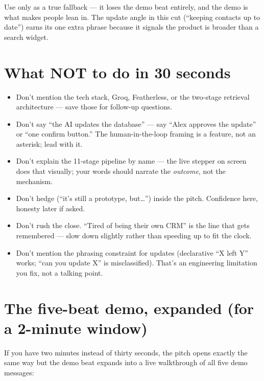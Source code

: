 \documentclass[11pt]{article}
\begin{document}
Use only as a true fallback --- it loses the demo beat entirely, and the demo is what makes people lean in. The update angle in this cut (``keeping contacts up to date'') earns its one extra phrase because it signals the product is broader than a search widget.

\section{What NOT to do in 30 seconds}
\begin{itemize}
    \item Don't mention the tech stack, Groq, Featherless, or the two-stage retrieval architecture --- save those for follow-up questions.
    \item Don't say ``the AI updates the database'' --- say ``Alex approves the update'' or ``one confirm button.'' The human-in-the-loop framing is a feature, not an asterisk; lead with it.
    \item Don't explain the 11-stage pipeline by name --- the live stepper on screen does that visually; your words should narrate the \emph{outcome}, not the mechanism.
    \item Don't hedge (``it's still a prototype, but\ldots'') inside the pitch. Confidence here, honesty later if asked.
    \item Don't rush the close. ``Tired of being their own CRM'' is the line that gets remembered --- slow down slightly rather than speeding up to fit the clock.
    \item Don't mention the phrasing constraint for updates (declarative ``X left Y'' works; ``can you update X'' is misclassified). That's an engineering limitation you fix, not a talking point.
\end{itemize}

\section{The five-beat demo, expanded (for a 2-minute window)}

If you have two minutes instead of thirty seconds, the pitch opens exactly the same way but the demo beat expands into a live walkthrough of all five demo messages:
\end{document}
